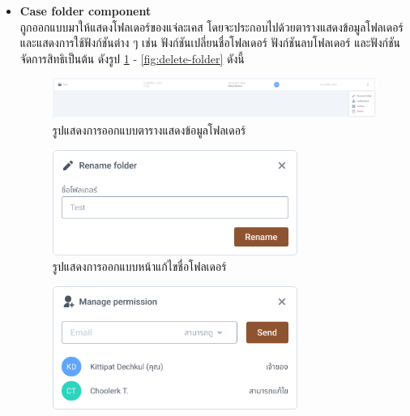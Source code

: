 \documentclass[12pt,oneside,openright,a4paper]{cpe-thai-project}
\begin{document}
\begin{itemize}
  \item \textbf{Case folder component} \\
\hspace*{1cm} ถูกออกแบบมาให้แสดงโฟลเดอร์ของแจ่ละเคส โดยจะประกอบไปด้วยตารางแสดงข้อมูลโฟลเดอร์ และแสดงการใช้ฟังก์ชันต่าง ๆ เช่น ฟังก์ชันเปลี่ยนชื่อโฟลเดอร์ ฟังก์ชันลบโฟลเดอร์ และฟังก์ชันจัดการสิทธิเป็นต้น ดังรูป \ref{fig:folder-component} - \ref{fig:delete-folder} ดังนี้
\begin{figure}[!h]\centering
  \includegraphics[width=16cm]{./assets/userinterface/folder-component.png}
  \caption{รูปแสดงการออกแบบตารางแสดงข้อมูลโฟลเดอร์}\label{fig:folder-component}
\end{figure}
\begin{figure}[!h]\centering
  \includegraphics[width=8cm]{./assets/userinterface/rename-folder.png}
  \caption{รูปแสดงการออกแบบหน้าแก้ไขชื่อโฟลเดอร์}\label{fig:rename-folder}
\end{figure}
\begin{figure}[!h]\centering
  \includegraphics[width=8cm]{./assets/userinterface/manage-folder-permission.png}

\end{figure}
\end{itemize}
\end{document}
